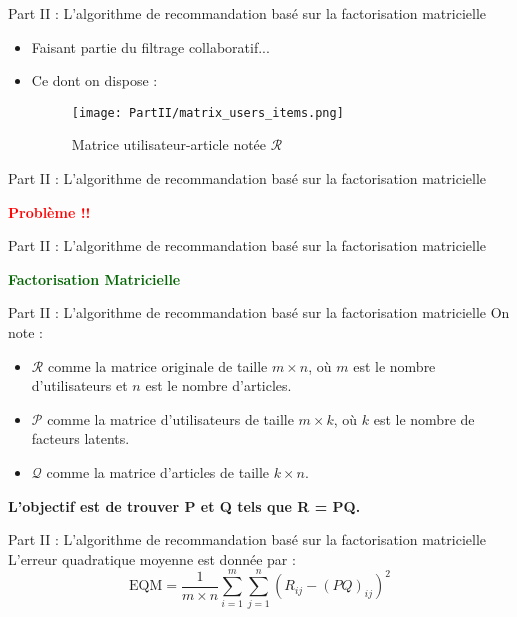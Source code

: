 \newcommand{\PartII}{Part II : L'algorithme de recommandation basé sur la factorisation matricielle}

\begin{frame}{\PartII}
	\begin{itemize}
		\item Faisant partie du filtrage collaboratif...
		\item {
		      Ce dont on dispose :
		      \begin{figure}[htbp]
			      \centering
			      \hspace{80pt}
			      \texttt{[image: PartII/matrix\_users\_items.png]}
			      \caption{Matrice utilisateur-article notée $\mathcal{R}$}
			      \label{fig:matrix-user-article}
		      \end{figure}
		      }
	\end{itemize}
\end{frame}

\begin{frame}{\PartII}
	\begin{center}
		\textcolor{red}{\textbf{\large{Problème !!}}}
	\end{center}
\end{frame}

\begin{frame}{\PartII}
	\begin{center}
		\textcolor{darkgreen}{\textbf{\large{Factorisation Matricielle}}}
	\end{center}
\end{frame}

\begin{frame}{\PartII}
	On note :
	\begin{itemize}
		\item $\mathcal{R}$ comme la matrice originale de taille $m \times n$, où $m$ est le nombre d'utilisateurs et $n$ est le nombre d'articles.
		\item $\mathcal{P}$ comme la matrice d'utilisateurs de taille $m \times k$, où $k$ est le nombre de facteurs latents.
		\item $\mathcal{Q}$ comme la matrice d'articles de taille $k \times n$.
	\end{itemize}
	\begin{center}
		\textbf{L'objectif est de trouver P et Q tels que R = PQ.}
	\end{center}
\end{frame}

\begin{frame}{\PartII}
	L'erreur quadratique moyenne est donnée par :
	\begin{equation*}
		\mathrm{EQM}=\frac{1}{m \times n} \sum_{i=1}^m \sum_{j=1}^n\left(R_{i j}-(P Q)_{i j}\right)^2
	\end{equation*}

\end{frame}

